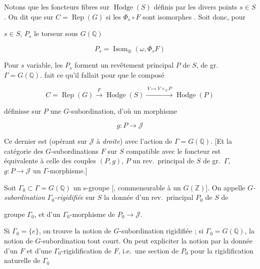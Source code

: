 \documentclass[11pt,a4paper]{article}
\begin{document}
Notons que les foncteurs fibres  sur 
$\operatorname{Hodge}(S)$ définis par les divers points $s \in S$ \ill{}
. On dit \ill{} que \ill{} sur $C =
\operatorname{Rep}(G)$ si les $\Phi_{s} \circ F$ sont isomorphes
\struck{\ill{}} \ill{}. Soit donc, pour



$s \in S$, $P_{s}$ le torseur sous $G(\mathbb{Q})$

\[ P_{s} = \operatorname{Isom}_{\otimes}(\omega, \Phi_{s} F) \]

Pour $s$ variable, les $P_{s}$ forment  \ill{} un revêtement
principal $P$ de $S$, de gr.\ $\Gamma = G(\mathbb{Q})$.  \ill{}
fait ce qu'il fallait pour que le composé

\[ C = \operatorname{Rep}(G) \xrightarrow{\ F\ } \operatorname{Hodge}(S) \xrightarrow{\ V \mapsto V \times_{S} P\ } \operatorname{Hodge}(P) \]

\struck{\ill{}} définisse sur $P$ une $G$-subordination, d'où un morphisme

\[ g : P \longrightarrow \mathcal{J} \]

 Ce dernier est  (opérant sur $\mathcal{J}$
à \emph{droite}) avec l'action de $\Gamma = G(\mathbb{Q})$. [Et la catégorie des
  $G$-subordinations $F$ sur $S$ compatible
avec le foncteur \ill{} est équivalente à celle des couples $(P, g)$, $P$ un
rev.\ principal de $S$ de gr.\ $\Gamma$, $g : P \to \mathcal{J}$ un
$\Gamma$-morphisme.]

Soit $\Gamma_{0} \subset \Gamma = G(\mathbb{Q})$ un s-groupe [\ill{},
commensurable à un $G(\mathbb{Z})$]. On appelle \emph{$G$-subordination
$\Gamma_{0}$-rigidifiée} sur $S$ la donnée d'un rev.\ principal $P_{0}$ de $S$
de


groupe $\Gamma_{0}$, et d'un $\Gamma_{0}$-morphisme de $P_{0} \to \mathcal{J}$.

Si $\Gamma_{0} = \{e\}$, on trouve la notion de $G$-subordination rigidifiée ;
si $\Gamma_{0} = G(\mathbb{Q})$, la notion de $G$-subordination
\struck{\ill{}} tout court. On peut expliciter la notion par la donnée d'un
$F$  et d'une \struck{\ill{}}
$\Gamma_{0}$-rigidification de $F$, i.e.\ une section de $P_{0}$ \ill{} pour la
rigidification naturelle de $\Gamma_{0}$ \ill{}
\end{document}
